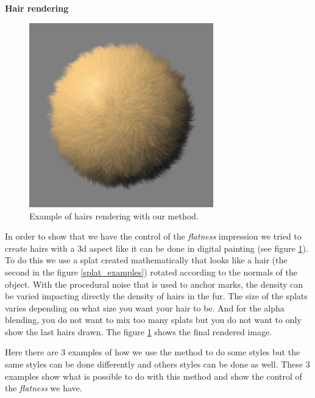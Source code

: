 \textbf{Hair rendering}

\begin{figure}
    \begin{center}
    \includegraphics[width=80mm, height=80mm]{Resultats/bouledepoil1/final.png}
    \end{center}
    \caption{Example of hairs rendering with our method.}
    \label{final_hair}
\end{figure}

In order to show that we have the control of the \textit{flatness} impression we tried to create hairs with a 3d aspect like it can be done in digital painting (see figure \ref{final_hair}). To do this we use a splat created mathematically that looks like a hair (the second in the figure \ref{splat_examples}) rotated according to the normals of the object. With the procedural noise that is used to anchor marks, the density can be varied impacting directly the density of hairs in the fur. The size of the splats varies depending on what size you want your hair to be. And for the alpha blending, you do not want to mix too many splats but you do not want to only show the last hairs drawn. The figure \ref{final_hair} shows the final rendered image. \newline

Here there are 3 examples of how we use the method to do some styles but the same styles can be done differently and others styles can be done as well. These 3 examples show what is possible to do with this method and show the control of the \textit{flatness} we have.
